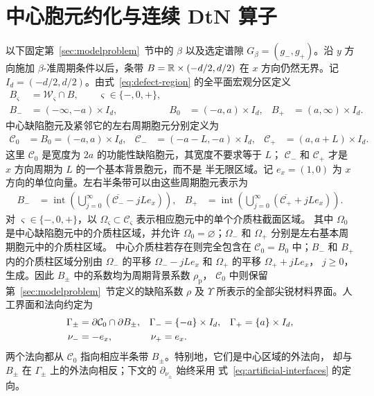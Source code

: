 \section{中心胞元约化与连续 DtN 算子}
\label{sec:dtn}

以下固定第~\ref{sec:modelproblem}~节中的 $\beta$ 以及选定谱隙
$G_\beta=(g_-,g_+)$。沿 $y$ 方向施加 $\beta$-准周期条件以后，条带
$B=\mathbb{R}\times(-d/2,d/2)$ 在 $x$ 方向仍然无界。记
$I_d=(-d/2,d/2)$。由式~\eqref{eq:defect-region} 的全平面宏观分区定义
\begin{align*}
  B_\varsigma&=\mathcal{W}_\varsigma\cap B,
  \qquad \varsigma\in\{-,0,+\},\\
  B_-&=(-\infty,-a)\times I_d,
  &B_0&=(-a,a)\times I_d,
  &B_+&=(a,\infty)\times I_d.
\end{align*}
中心缺陷胞元及紧邻它的左右周期胞元分别定义为
\begin{align}
  \mathcal{C}_0&=B_0=(-a,a)\times I_d,
  &\mathcal{C}_-&=(-a-L,-a)\times I_d,
  &\mathcal{C}_+&=(a,a+L)\times I_d.
  \label{eq:center-and-lead-cells}
\end{align}
这里 $\mathcal{C}_0$ 是宽度为 $2a$ 的功能性缺陷胞元，其宽度不要求等于 $L$；
$\mathcal{C}_-$ 和 $\mathcal{C}_+$ 才是 $x$ 方向周期为 $L$ 的一个基本背景胞元，而不是
半无限区域。记 $e_x=(1,0)$ 为 $x$ 方向的单位向量。左右半条带可以由这些周期胞元表示为
\begin{align}
  B_-
  &=\operatorname{int}\!\left(
    \bigcup_{j=0}^{\infty}
    (\overline{\mathcal{C}_-}-jL e_x)\right),
  &
  B_+
  &=\operatorname{int}\!\left(
    \bigcup_{j=0}^{\infty}
    (\overline{\mathcal{C}_+}+jL e_x)\right).
  \label{eq:half-guides}
\end{align}
对 $\varsigma\in\{-,0,+\}$，以
$\Omega_\varsigma\subset\mathcal{C}_\varsigma$ 表示相应胞元中的单个介质柱截面区域。
其中 $\Omega_0$ 是中心缺陷胞元中的介质柱区域，并允许
$\Omega_0=\varnothing$；$\Omega_-$ 和 $\Omega_+$ 分别是左右基本周期胞元中的介质柱区域。
中心介质柱若存在则完全包含在 $\mathcal{C}_0=B_0$ 中；$B_-$ 和 $B_+$ 内的介质柱区域分别由
$\Omega_-$ 的平移 $\Omega_--jLe_x$ 和 $\Omega_+$ 的平移 $\Omega_++jLe_x$，
$j\geq0$，生成。因此 $B_\pm$ 中的系数均为周期背景系数 $\rho_{\mathrm p}$，
$\mathcal{C}_0$ 中则保留第~\ref{sec:modelproblem}~节定义的缺陷系数 $\rho$ 及
$\Upsilon$ 所表示的全部尖锐材料界面。人工界面和法向约定为
\begin{align}
  \Gamma_\pm
  &=\partial\mathcal{C}_0\cap\partial B_\pm,
  &\Gamma_-&=\{-a\}\times I_d,
  &\Gamma_+&=\{a\}\times I_d,
  \notag\\
  \nu_-&=-e_x,
  &\nu_+&=e_x.
  \label{eq:artificial-interfaces}
\end{align}
两个法向都从 $\mathcal{C}_0$ 指向相应半条带 $B_\pm$。特别地，它们是中心区域的外法向，
却与 $B_\pm$ 在 $\Gamma_\pm$ 上的外法向相反；下文的 $\partial_{\nu_\pm}$ 始终采用
式~\eqref{eq:artificial-interfaces} 的定向。

